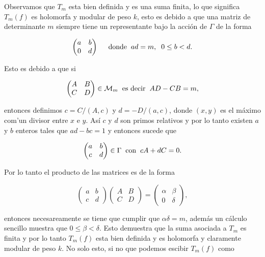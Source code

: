 \documentclass[letterpaper]{report}
\newcommand{\ga}{\ensuremath{\Gamma}}
\begin{document}
\noindent Observamos que $T_m$ esta bien definida y es una suma finita, lo que significa $T_m(f)$ es holomorfa y modular de peso $k$, esto es debido a que una matriz de determinante $m$ siempre tiene un representante bajo la acción de $\ga$ de la forma

$$
\begin{pmatrix}
a & b \\
0 & d 
\end{pmatrix}
\hspace{0.5cm}\textrm{donde}\hspace{0.2cm}ad=m,\hspace{0.2cm}0\leq b < d.
$$

Esto es debido a que si 

$$
\begin{pmatrix}
A & B \\
C & D 
\end{pmatrix}\in\mathcal{M}_m\hspace{0.2cm}\textrm{es decir}\hspace{0.2cm} AD-CB=m,$$

\noindent entonces definimos  $c=C/(A,c)$ y $d=-D/(a,c)$, donde $(x,y)$ es el máximo com'un divisor entre $x$ e $y$. Así $c$ y $d$ son primos relativos y por lo tanto existen $a$ y $b$ enteros tales que $ad-bc=1$ y entonces sucede que

$$
\begin{pmatrix}
a & b \\
c & d 
\end{pmatrix}\in\ga\hspace{0.2cm}\textrm{con}\hspace{0.2cm} cA+dC=0.   
$$

Por lo tanto el producto de las matrices es de la forma

$$
\begin{pmatrix}
a & b \\
c & d 
\end{pmatrix}\begin{pmatrix}
A & B \\
C & D 
\end{pmatrix}=\begin{pmatrix}
\alpha & \beta \\
0 & \delta 
\end{pmatrix},   
$$

\noindent entonces necesareamente se tiene que cumplir que $\alpha\delta=m$, además un cálculo sencillo muestra que $0\leq\beta<\delta$. Esto demuestra que la suma asociada a $T_m$ es finita y por lo tanto $T_m(f)$ esta bien definida y es holomorfa y claramente modular de peso $k$. No solo esto, si no que podemos escibir $T_m(f)$ como
\end{document}
